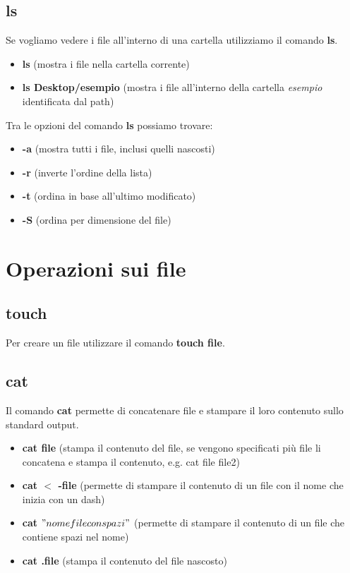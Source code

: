 \documentclass[oneside,a4paper,11pt]{book}
\theoremstyle{italicstyle}
\theoremstyle{normStyle}
\begin{document}
\subsection{ls}
Se vogliamo vedere i file all'interno di una cartella utilizziamo il comando \textbf{ls}.
\begin{itemize}
    \item \textbf{ls} (mostra i file nella cartella corrente)
    \item \textbf{ls Desktop/esempio} (mostra i file all'interno della cartella \textit{esempio} identificata dal path)
\end{itemize}
Tra le opzioni del comando \textbf{ls} possiamo trovare:
\begin{itemize}
    \item \textbf{-a} (mostra tutti i file, inclusi quelli nascosti)
    \item \textbf{-r} (inverte l'ordine della lista)
    \item \textbf{-t} (ordina in base all'ultimo modificato)
    \item \textbf{-S} (ordina per dimensione del file)
\end{itemize}

\section{Operazioni sui file}
\subsection{touch}
Per creare un file utilizzare il comando \textbf{touch file}.

\subsection{cat}
Il comando \textbf{cat} permette di concatenare file e stampare il loro contenuto sullo standard output.
\begin{itemize}
    \item \textbf{cat file} (stampa il contenuto del file, se vengono specificati più file li concatena e stampa il contenuto, e.g. cat file file2)
    \item \textbf{cat $<$ -file} (permette di stampare il contenuto di un file con il nome che inizia con un dash)
    \item \textbf{cat $"nome file con spazi"$} (permette di stampare il contenuto di un file che contiene spazi nel nome)
    \item \textbf{cat .file} (stampa il contenuto del file nascosto)
\end{itemize}
\end{document}
